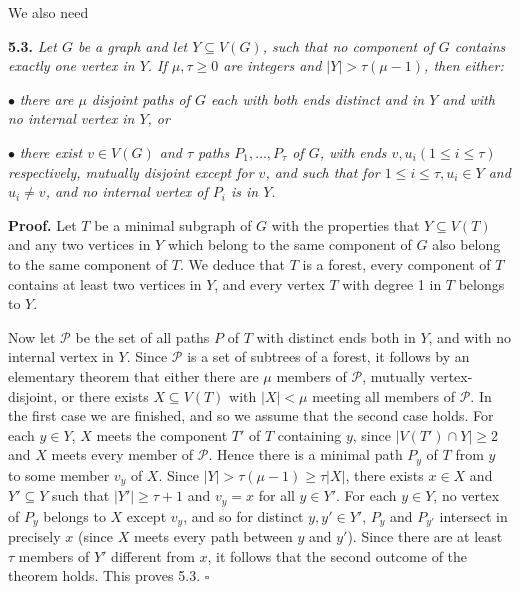 We also need

\textbf{5.3.} \textit{Let $G$ be a graph and let $Y \subseteq V(G)$, such that no component of $G$ contains exactly one vertex in $Y$. If $\mu, \tau \ge 0$ are integers and $|Y| > \tau(\mu - 1)$, then either:}

\hspace*{12pt}$\bullet$ \textit{there are $\mu$ disjoint paths of $G$ each with both ends distinct and in $Y$ and with no internal vertex in $Y$, or}

\hspace*{12pt}$\bullet$ \textit{there exist $v \in V(G)$ and $\tau$ paths $P_1, \dots, P_\tau$ of $G$, with ends $v, u_i (1 \le i \le \tau)$ respectively, mutually disjoint except for $v$, and such that for $1 \le i \le \tau, u_i \in Y$ and $u_i \ne v$, and no internal vertex of $P_i$ is in $Y$.}

\textbf{Proof.} Let $T$ be a minimal subgraph of $G$ with the properties that $Y \subseteq V(T)$ and any two vertices in $Y$ which belong to the same component of $G$ also belong to the same component of $T$. We deduce that $T$ is a forest, every component of $T$ contains at least two vertices in $Y$, and every vertex $T$ with degree 1 in $T$ belongs to $Y$.

Now let $\mathscr{P}$ be the set of all paths $P$ of $T$ with distinct ends both in $Y$, and with no internal vertex in $Y$. Since $\mathscr{P}$ is a set of subtrees of a forest, it follows by an elementary theorem that either there are $\mu$ members of $\mathscr{P}$, mutually vertex-disjoint, or there exists $X \subseteq V(T)$ with $|X| < \mu$ meeting all members of $\mathscr{P}$. In the first case we are finished, and so we assume that the second case holds. For each $y \in Y$, $X$ meets the component $T'$ of $T$ containing $y$, since $|V(T') \cap Y| \ge 2$ and $X$ meets every member of $\mathscr{P}$. Hence there is a minimal path $P_y$ of $T$ from $y$ to some member $v_y$ of $X$. Since $|Y| > \tau(\mu - 1) \ge \tau|X|$, there exists $x \in X$ and $Y' \subseteq Y$ such that $|Y'| \ge \tau + 1$ and $v_y = x$ for all $y \in Y'$. For each $y \in Y$, no vertex of $P_y$ belongs to $X$ except $v_y$, and so for distinct $y, y' \in Y'$, $P_y$ and $P_{y'}$ intersect in precisely $x$ (since $X$ meets every path between $y$ and $y'$). Since there are at least $\tau$ members of $Y'$ different from $x$, it follows that the second outcome of the theorem holds. This proves 5.3. $\square$

